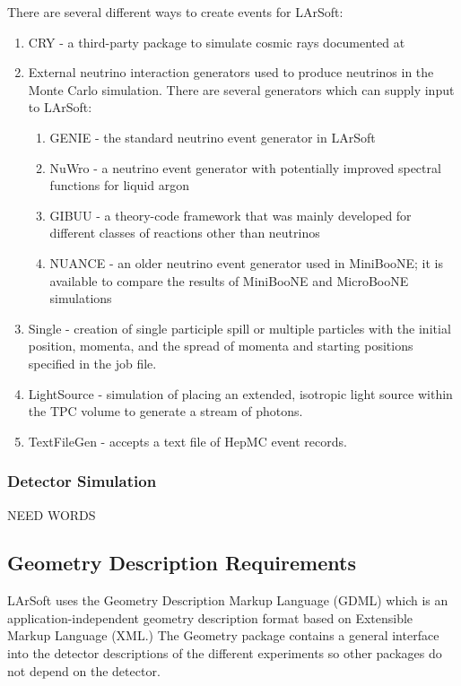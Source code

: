 \documentclass[12pt]{elsarticle}
\begin{document}
There are several different ways to create events for LArSoft:
\begin{enumerate}
\item{CRY - a third-party package to simulate cosmic rays documented at \cite{cry}}
\item{External neutrino interaction generators used to produce neutrinos in the Monte Carlo simulation. There are several generators which can supply input to LArSoft:}
\begin{enumerate}
\item{GENIE\cite{genie} - the standard neutrino event generator in LArSoft}
\item{NuWro\cite{nuwro} - a neutrino event generator with potentially improved spectral functions for liquid argon}
\item{GIBUU\cite{gibuu} - a theory-code framework that was mainly developed for different classes of reactions other than neutrinos}
\item{NUANCE\cite{nuance} - an older neutrino event generator used in MiniBooNE; it is available to compare the results of MiniBooNE and MicroBooNE simulations}
\end{enumerate}
\item{Single - creation of single participle spill or multiple particles with the initial position, momenta, and the spread of momenta and starting positions specified in the job file.}
\item{LightSource - simulation of placing an extended, isotropic light source within the TPC volume to generate a stream of photons.}
\item{TextFileGen - accepts a text file of HepMC\cite{hepmc} event records.}
\end{enumerate}

\subsubsection{Detector Simulation}
NEED WORDS

\subsection{Geometry Description Requirements}
LArSoft uses the Geometry Description Markup Language (GDML) which is an application-independent geometry description format based on Extensible Markup Language (XML.) 
The Geometry package contains a general interface into the detector descriptions of the different experiments so other packages do not depend on the detector. 
\end{document}
